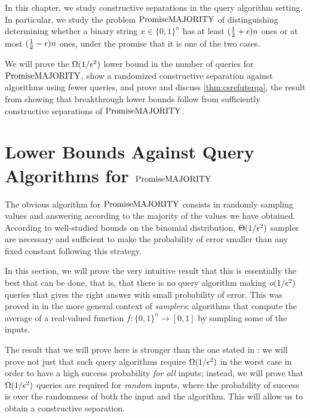 
In this chapter, we study constructive separations in the query algorithm setting.
In particular, we study the problem $\mathrm{PromiseMAJORITY}$ of distinguishing determining whether
a binary string $x \in \{0, 1\}^n$ has at least $(\frac{1}{2}+\epsilon)n$ ones or
at most $(\frac{1}{2}-\epsilon)n$ ones, under the promise that it is one of the two
cases. 

We will prove the $\Omega(1/\epsilon^2)$ lower bound in the number of queries
for $\mathrm{PromiseMAJORITY}$, show a randomized constructive separation against algorithms
using fewer queries, and prove and discuss \cref{thm:csrefuterqa}, the result
from \cite{ConstructiveSeparations} showing that breakthrough lower
bounds follow from sufficiently constructive separations of $\mathrm{PromiseMAJORITY}$.  


\section{Lower Bounds Against Query Algorithms for $\mathrm{PromiseMAJORITY}$}
\label{sec:lbqa}

The obvious algorithm for $\mathrm{PromiseMAJORITY}$ consists in randomly sampling values and answering 
according to the majority of the values we have obtained. According to well-studied
bounds on the binomial distribution, $\Theta(1/\epsilon^2)$ samples
are necessary and sufficient to make the probability of error smaller than any 
fixed constant following this strategy.

In this section, we will prove the very intuitive result that this is essentially
the best that can be done, that is, that there is no query algorithm making $o(1/\epsilon^2)$
queries that gives the right answer with small probability of error. This was 
proved in \cite{Canetti95} in the more general context of \emph{samplers}: algorithms
that compute the average of a real-valued function $f \colon \{0, 1\}^n \to [0, 1]$
by sampling some of the inputs. 

The result that we will prove here is stronger than the one stated in \cite{Canetti95}:
we will prove not just that such query algorithms require $\Omega(1/\epsilon^2)$ in the 
worst case in order to have a high success probability \emph{for all} inputs; instead,
we will prove that $\Omega(1/\epsilon^2)$ queries are required for \emph{random} inputs,
where the probability of success is over the randomness of both the input and the algorithm.
This will allow us to obtain a constructive separation.

